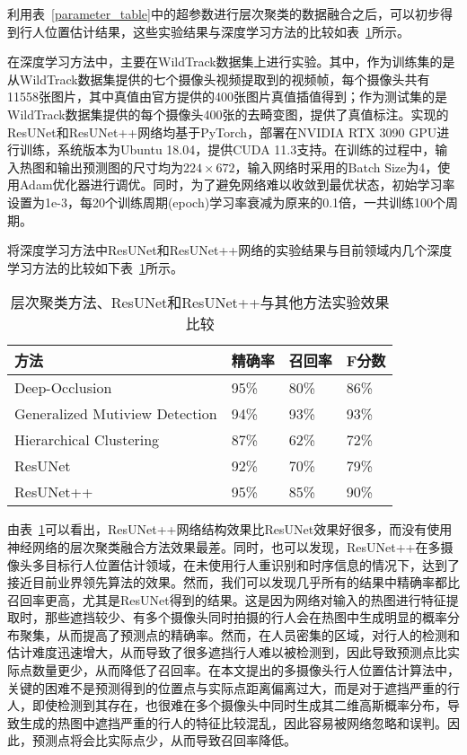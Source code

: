 利用表~\ref{parameter_table}中的超参数进行层次聚类的数据融合之后，可以初步得到行人位置估计结果，这些实验结果与深度学习方法的比较如表~\ref{experiments}所示。

在深度学习方法中，主要在WildTrack数据集上进行实验。其中，作为训练集的是从WildTrack数据集提供的七个摄像头视频提取到的视频帧，每个摄像头共有11558张图片，其中真值由官方提供的400张图片真值插值得到；作为测试集的是WildTrack数据集提供的每个摄像头400张的去畸变图，提供了真值标注。实现的ResUNet和ResUNet++网络均基于PyTorch，部署在NVIDIA RTX 3090 GPU进行训练，系统版本为Ubuntu 18.04，提供CUDA 11.3支持。在训练的过程中，输入热图和输出预测图的尺寸均为$224\times 672$，输入网络时采用的Batch Size为4，使用Adam优化器进行调优。同时，为了避免网络难以收敛到最优状态，初始学习率设置为1e-3，每20个训练周期(epoch)学习率衰减为原来的0.1倍，一共训练100个周期。

将深度学习方法中ResUNet和ResUNet++网络的实验结果与目前领域内几个深度学习方法的比较如下表~\ref{experiments}所示。
\begin{table}
    \centering
    \caption{层次聚类方法、ResUNet和ResUNet++与其他方法实验效果比较}
    \begin{tabular}{llll}
        \toprule
        方法 & 精确率  & 召回率 & F分数                       \\
        \midrule
        Deep-Occlusion\cite{baque2017deep} & 95\% & 80\% & 86\%                  \\
        Generalized Mutiview Detection\cite{vora2021bringing} & 94\% & 93\% & 93\%  \\
        Hierarchical Clustering & 87\% & 62\% & 72\%         \\
        ResUNet & 92\% & 70\% & 79\%                         \\
        ResUNet++ & 95\% & 85\% & 90\%                      \\
        \bottomrule
    \end{tabular}
    \label{experiments}
\end{table}

由表~\ref{experiments}可以看出，ResUNet++网络结构效果比ResUNet效果好很多，而没有使用神经网络的层次聚类融合方法效果最差。同时，也可以发现，ResUNet++在多摄像头多目标行人位置估计领域，在未使用行人重识别和时序信息的情况下，达到了接近目前业界领先算法的效果。然而，我们可以发现几乎所有的结果中精确率都比召回率更高，尤其是ResUNet得到的结果。这是因为网络对输入的热图进行特征提取时，那些遮挡较少、有多个摄像头同时拍摄的行人会在热图中生成明显的概率分布聚集，从而提高了预测点的精确率。然而，在人员密集的区域，对行人的检测和估计难度迅速增大，从而导致了很多遮挡行人难以被检测到，因此导致预测点比实际点数量更少，从而降低了召回率。在本文提出的多摄像头行人位置估计算法中，关键的困难不是预测得到的位置点与实际点距离偏离过大，而是对于遮挡严重的行人，即使检测到其存在，也很难在多个摄像头中同时生成其二维高斯概率分布，导致生成的热图中遮挡严重的行人的特征比较混乱，因此容易被网络忽略和误判。因此，预测点将会比实际点少，从而导致召回率降低。

